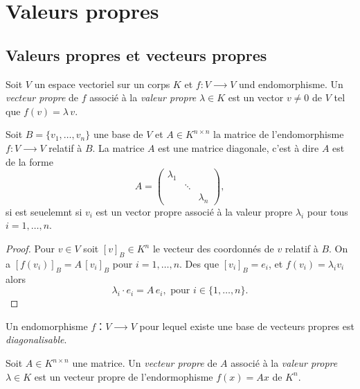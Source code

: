\chapter{Valeurs propres}
\label{cha:valeurs-propres-et}


\section{Valeurs propres et vecteurs propres} 
\label{sec:valeurs-propres-et}

\begin{definition}
  \label{def:16}
  Soit $V$ un espace vectoriel sur un corps $K$ et $f \colon V ⟶V$ und endomorphisme. Un \emph{vecteur propre} de $f$  associé à la \emph{valeur propre} $λ ∈K$ est un vector $v ≠ 0$ de $V$ tel que $f(v) = λ\,v$. 
\end{definition}


\begin{lemma}
  \label{lem:4}
  Soit $B = \{v_1,\dots,v_n\}$ une base de $V$ et $A ∈ K^{n×n}$ la matrice de l'endomorphisme $f : V ⟶V$ relatif à $B$. La matrice $A$ est une matrice diagonale, c'est à dire $A$ est de la forme 
  \begin{displaymath}
    A =
    \begin{pmatrix}
      λ_1  \\
         & \ddots \\
         & & λ_n
    \end{pmatrix},
  \end{displaymath}
si est seuelemnt si $v_i$ est un vector propre associé à la valeur propre $λ_i$ pour tous $i=1,\dots,n$. 
\end{lemma}

\begin{proof}
    Pour $v ∈V$ soit $[v]_B ∈K^n$ le vecteur des coordonnés de $v$ relatif à $B$. On a $[f(v_i)]_B = A \,  [v_i]_B$ pour $i=1,\dots,n$. Des que $[v_i]_B = e_i$, et $f(v_i) = λ_i v_i$ alors 
    \begin{displaymath}
      λ_i ⋅ e_i = A \, e_i, \text{ pour } i ∈\{1,\dots,n\}. 
    \end{displaymath}
\end{proof}


\begin{definition}
  \label{def:39}
  Un endomorphisme $f ：V ⟶ V$ pour lequel existe une base de vecteurs propres est \emph{diagonalisable}. 
\end{definition}


\begin{definition}
  \label{def:40}
  Soit $A ∈ K^{n ×n}$ une matrice. 
  Un \emph{vecteur propre} de $A$ associé à la \emph{valeur propre} $λ ∈K$ est un vecteur propre de l'endormophisme  $f(x) = Ax$ de $K^n$. 
\end{definition}




